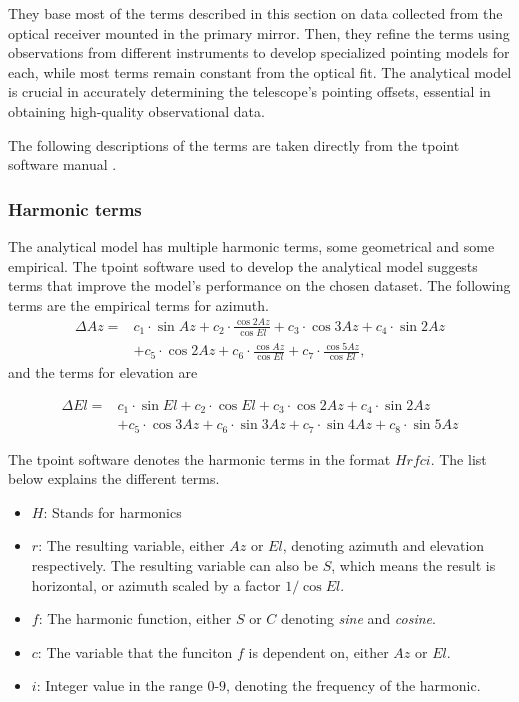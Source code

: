 They base most of the terms described in this section on data collected from the optical receiver mounted in the primary mirror.
Then, they refine the terms using observations from different instruments to develop specialized pointing models for each, while most terms remain constant from the optical fit.
The analytical model is crucial in accurately determining the telescope's pointing offsets, essential in obtaining high-quality observational data.

The following descriptions of the terms are taken directly from the tpoint software manual \cite{tpoint_manual}.

\subsubsection{Harmonic terms}
The analytical model has multiple harmonic terms, some geometrical and some empirical.
The tpoint software used to develop the analytical model suggests terms that improve the model's performance on the chosen dataset.
The following terms are the empirical terms for azimuth.
\begin{align}
    \Delta Az =&  c_1 \cdot \sin{Az} + c_2 \cdot \frac{\cos{2Az}}{\cos{El}} + c_3 \cdot \cos{3Az} + c_4 \cdot \sin{2Az} \\
    &+ c_5 \cdot \cos{2Az} + c_6 \cdot \frac{\cos{Az}}{\cos{El}} + c_7 \cdot \frac{\cos{5Az}}{\cos{El}},
\end{align}
and the terms for elevation are

\begin{align}
    \Delta El =&  c_1 \cdot \sin{El} + c_2 \cdot \cos{El}+ c_3 \cdot \cos{2Az} + c_4 \cdot \sin{2Az} \\
    &+ c_5 \cdot \cos{3Az} + c_6 \cdot \sin{3Az} + c_7 \cdot \sin{4Az} + c_8 \cdot \sin{5Az}  
\end{align}


The tpoint software denotes the harmonic terms in the format $Hrfci$. The list below explains the different terms.

\begin{itemize}
    \item $H$: Stands for harmonics
    \item $r$: The resulting variable, either $Az$ or $El$, denoting azimuth and elevation respectively.
    The resulting variable can also be $S$, which means the result is horizontal, or azimuth scaled by a factor $1/\cos{El}$.
    \item $f$: The harmonic function, either $S$ or $C$ denoting \textit{sine} and \textit{cosine}.
    \item $c$: The variable that the funciton $f$ is dependent on, either $Az$ or $El$.
    \item $i$: Integer value in the range $0$-$9$, denoting the frequency of the harmonic.
\end{itemize}

